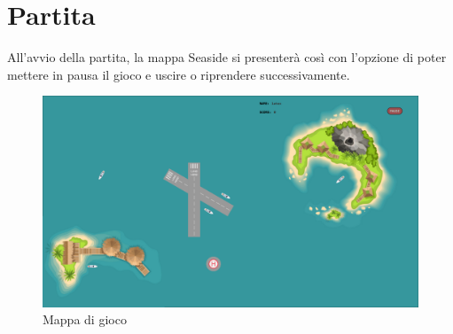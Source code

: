 \documentclass[a4paper,12pt]{report}
\begin{document}
\clearpage

\section*{Partita}
All'avvio della partita, la mappa Seaside si presenterà così con l'opzione di poter mettere in pausa il gioco e uscire o riprendere successivamente.
\begin{figure}[H]
    \begin{center}
        \centering
        \includegraphics[width=\textwidth]{img/GuidaUtente/Seaside.png}
    \end{center}
    \caption{Mappa di gioco}
    \label{img:seaside}
\end{figure}
\end{document}
